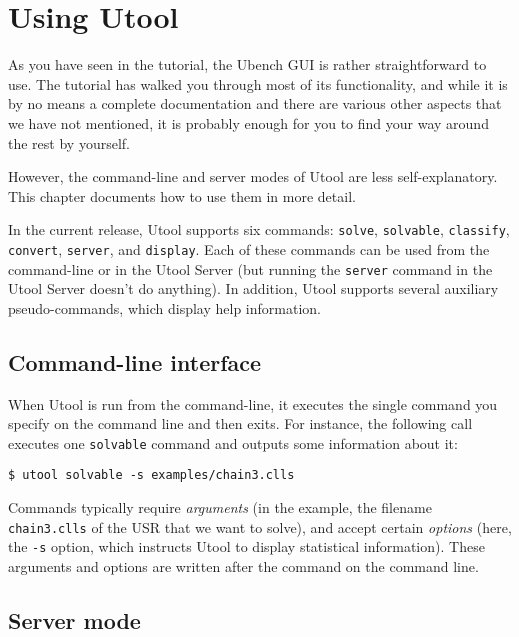 
\section{Using Utool}  \label{sec:operations}

As you have seen in the tutorial, the Ubench GUI is rather straightforward to use. The tutorial has walked you through most of its functionality, and while it is by no means a complete documentation and there are various other aspects that we have not mentioned, it is probably enough for you to find your way around the rest by yourself.

However, the command-line and server modes of Utool are less self-explanatory. This chapter documents how to use them in more detail. 

In the current release, Utool supports six commands: \verb?solve?,
\verb?solvable?, \verb?classify?, \verb?convert?, \verb?server?, and
\verb?display?. Each of these commands can be used from the
command-line or in the Utool Server (but running the \verb?server?
command in the Utool Server doesn't do anything). In addition, Utool
supports several auxiliary pseudo-commands, which display help
information. 

\subsection{Command-line interface}
When Utool is run from the command-line, it executes the single
command you specify on the command line and then exits. For instance,
the following call executes one \verb?solvable? command and outputs
some information about it:

\begin{verbatim}
$ utool solvable -s examples/chain3.clls
\end{verbatim}

Commands typically require \emph{arguments} (in the example, the
filename \verb?chain3.clls? of the USR that we want to solve), and
accept certain \emph{options} (here, the \verb?-s? option, which
instructs Utool to display statistical information). These arguments
and options are written after the command on the command line.


\subsection{Server mode} \label{sec:operations-server}

